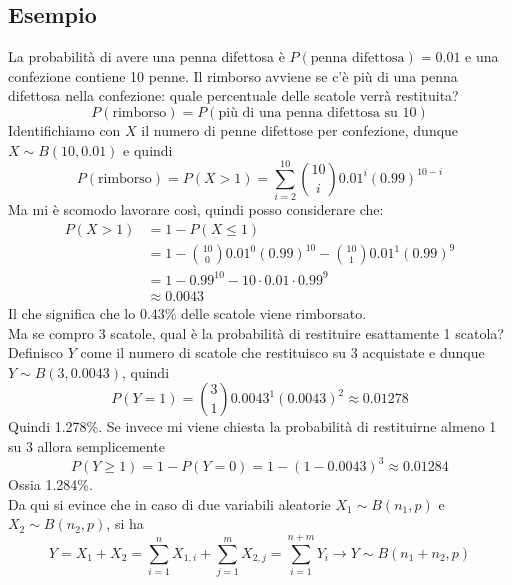 \documentclass[11pt]{report}
\begin{document}
\begin{center}
    
\end{center}
\begin{center}
    
\end{center}

\subsection{Esempio}
La probabilità di avere una penna difettosa è $P(\text{penna difettosa}) = 0.01$ e una confezione contiene 10 penne. Il rimborso avviene se c'è più di una penna difettosa nella confezione: quale percentuale delle scatole verrà restituita?
\begin{equation}
    P(\text{rimborso}) = P(\text{più di una penna difettosa su 10})
\end{equation}
Identifichiamo con $X$ il numero di penne difettose per confezione, dunque $X \sim B(10, 0.01)$ e quindi
\begin{equation}
    P(\text{rimborso}) = P(X > 1) = \sum_{i=2}^{10} \binom{10}{i} 0.01^i (0.99)^{10-i}
\end{equation}
Ma mi è scomodo lavorare così, quindi posso considerare che:
\begin{equation}
    \begin{split}
        P(X > 1) & = 1 - P(X \leq 1)\\
        & = 1 - \binom{10}{0} 0.01^0 (0.99)^{10} - \binom{10}{1} 0.01^1 (0.99)^9\\
        & = 1 - 0.99^{10} - 10 \cdot 0.01 \cdot 0.99^9\\
        & \approx 0.0043
    \end{split}
\end{equation}
Il che significa che lo 0.43\% delle scatole viene rimborsato.\\
Ma se compro 3 scatole, qual è la probabilità di restituire esattamente 1 scatola?\\
Definisco $Y$ come il numero di scatole che restituisco su 3 acquistate e dunque $Y \sim B(3, 0.0043)$, quindi
\begin{equation}
    P(Y = 1) = \binom{3}{1} 0.0043^1 (0.0043)^{2} \approx 0.01278
\end{equation}
Quindi 1.278\%. Se invece mi viene chiesta la probabilità di restituirne almeno 1 su 3 allora semplicemente
\begin{equation}
    P(Y \geq 1) = 1 - P(Y = 0) = 1 - (1 - 0.0043)^3 \approx 0.01284
\end{equation}
Ossia 1.284\%.\\
Da qui si evince che in caso di due variabili aleatorie $X_1 \sim B(n_1,p)$ e $X_2 \sim B(n_2,p)$, si ha
\begin{equation}
    Y = X_1 + X_2 = \sum_{i=1}^n X_{1,i} + \sum_{j=1}^m X_{2,j} = \sum_{i=1}^{n+m} Y_i \rightarrow Y \sim B(n_1 + n_2, p)
\end{equation}
\end{document}
